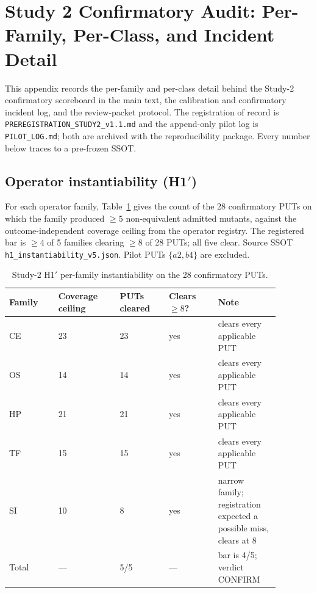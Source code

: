 \documentclass[manuscript,screen,review]{acmart}
\begin{document}
\section{Study 2 Confirmatory Audit: Per-Family, Per-Class, and Incident Detail}\label{j.-study2-confirmatory-detail}

This appendix records the per-family and per-class detail behind the
Study-2 confirmatory scoreboard in the main text, the calibration and
confirmatory incident log, and the review-packet protocol. The
registration of record is
\texttt{PREREGISTRATION\_STUDY2\_v1.1.md} and the append-only pilot log is
\texttt{PILOT\_LOG.md}; both are archived with the reproducibility
package. Every number below traces to a pre-frozen SSOT.

\subsection{Operator instantiability (H1\('\))}\label{j.1-h1-instantiability}

For each operator family, Table~\ref{tab:study2-h1} gives the count of
the 28 confirmatory PUTs on which the family produced \(\geq 5\)
non-equivalent admitted mutants, against the outcome-independent coverage
ceiling from the operator registry. The registered bar is \(\geq 4\) of 5
families clearing \(\geq 8\) of 28 PUTs; all five clear. Source SSOT
\texttt{h1\_instantiability\_v5.json}. Pilot PUTs \(\{a2, b4\}\) are
excluded.

{%
\small
\begin{longtable}[]{@{}p{0.16\linewidth}p{0.20\linewidth}p{0.16\linewidth}p{0.16\linewidth}p{0.20\linewidth}@{}}
\caption{Study-2 H1\('\) per-family instantiability on the 28
confirmatory PUTs.}\label{tab:study2-h1}\\
\toprule\noalign{}
Family & Coverage ceiling & PUTs cleared & Clears $\geq 8$? & Note \\
\midrule\noalign{}
\endfirsthead
\endhead
\bottomrule\noalign{}
\endlastfoot
CE & 23 & 23 & yes & clears every applicable PUT \\
OS & 14 & 14 & yes & clears every applicable PUT \\
HP & 21 & 21 & yes & clears every applicable PUT \\
TF & 15 & 15 & yes & clears every applicable PUT \\
SI & 10 & 8 & yes & narrow family; registration expected a possible miss, clears at 8 \\
\midrule
Total & --- & 5/5 & --- & bar is 4/5; verdict CONFIRM \\
\end{longtable}
\normalsize
}
\end{document}
